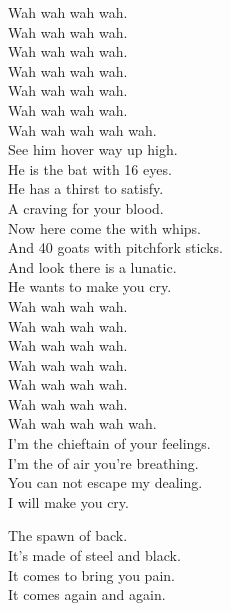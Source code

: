 Wah wah wah wah. \\
Wah wah wah wah. \\
Wah wah wah wah. \\
Wah wah wah wah. \\

Wah wah wah wah. \\
Wah wah wah wah. \\
Wah wah wah wah wah. \\

See him hover way up high. \\
He is the bat with 16 eyes. \\
He has a thirst to satisfy. \\
A craving for your blood. \\

Now here come the  with whips. \\
And 40 goats with pitchfork sticks. \\
And look there is a lunatic. \\
He wants to make you cry. \\

Wah wah wah wah. \\
Wah wah wah wah. \\
Wah wah wah wah. \\
Wah wah wah wah. \\

Wah wah wah wah. \\
Wah wah wah wah. \\
Wah wah wah wah wah. \\

I'm the chieftain of your feelings. \\
I'm the  of air you're breathing. \\
You can not escape my dealing. \\
I will make you cry. \\




The spawn of  back. \\
It's made of steel and black. \\
It comes to bring you pain. \\
It comes again and again. \\

